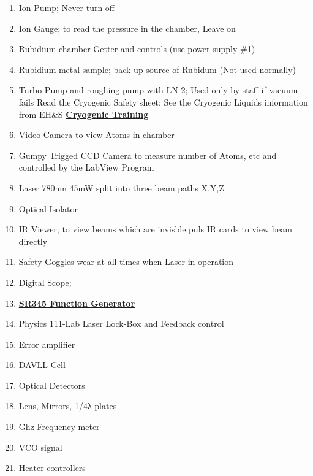 \documentclass{../lab}
\begin{document}
\begin{enumerate}
    \item Ion Pump; Never turn off

    \item Ion Gauge; to read the pressure in the chamber, Leave on

    \item Rubidium chamber Getter and controls (use power supply \#1)

    \item Rubidium metal sample; back up source of Rubidum (Not used normally)

    \item Turbo Pump and roughing pump with LN-2; Used only by staff if vacuum fails Read the Cryogenic Safety sheet: See the Cryogenic Liquids information from EH\&S \href{http://experimentationlab.berkeley.edu/sites/default/files/SHE/77cryogenic.pdf}{\textbf{Cryogenic Training}}

    \item Video Camera to view Atoms in chamber

    \item Gumpy Trigged CCD Camera to measure number of Atoms, etc and controlled by the LabView Program

    \item Laser 780nm 45mW split into three beam paths X,Y,Z

    \item Optical Isolator

    \item IR Viewer; to view beams which are invisble puls IR cards to view beam directly

    \item Safety Goggles wear at all times when Laser in operation

    \item Digital Scope;

    \item \href{https://youtu.be/PrM8DHFOFS0}{\textbf{SR345 Function Generator}}

    \item Physics 111-Lab Laser Lock-Box and Feedback control

    \item Error amplifier

    \item DAVLL Cell

    \item Optical Detectors

    \item Lens, Mirrors, 1/4λ plates

    \item Ghz Frequency meter

    \item VCO signal

    \item Heater controllers
\end{enumerate}
\end{document}
